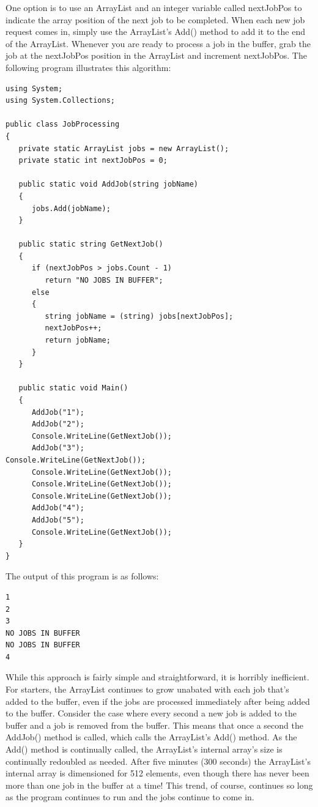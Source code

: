\documentclass[12pt,a4paper,final,twoside,titlepage]{book}
\begin{document}
One option is to use an ArrayList and an integer variable called nextJobPos to indicate the array position of the next job to be completed. When each new job request comes in, simply use the ArrayList's Add() method to add it to the end of the ArrayList. Whenever you are ready to process a job in the buffer, grab the job at the nextJobPos position in the ArrayList and increment nextJobPos. The following program illustrates this algorithm:
\begin{lstlisting}
using System;
using System.Collections;

public class JobProcessing
{
   private static ArrayList jobs = new ArrayList();
   private static int nextJobPos = 0;
   
   public static void AddJob(string jobName)
   {
      jobs.Add(jobName);
   }
   
   public static string GetNextJob()
   {
      if (nextJobPos > jobs.Count - 1)
         return "NO JOBS IN BUFFER";
      else
      {
         string jobName = (string) jobs[nextJobPos];
         nextJobPos++;
         return jobName;
      }
   }
   
   public static void Main()
   {
      AddJob("1");
      AddJob("2");
      Console.WriteLine(GetNextJob());
      AddJob("3");
Console.WriteLine(GetNextJob());
      Console.WriteLine(GetNextJob());
      Console.WriteLine(GetNextJob());
      Console.WriteLine(GetNextJob());
      AddJob("4");
      AddJob("5");
      Console.WriteLine(GetNextJob());
   }
}
\end{lstlisting}
The output of this program is as follows:
\begin{lstlisting}
1
2
3
NO JOBS IN BUFFER
NO JOBS IN BUFFER
4
\end{lstlisting}
While this approach is fairly simple and straightforward, it is horribly inefficient. For starters, the ArrayList continues to grow unabated with each job that's added to the buffer, even if the jobs are processed immediately after being added to the buffer. Consider the case where every second a new job is added to the buffer and a job is removed from the buffer. This means that once a second the AddJob() method is called, which calls the ArrayList's Add() method. As the Add() method is continually called, the ArrayList's internal array's size is continually redoubled as needed. After five minutes (300 seconds) the ArrayList's internal array is dimensioned for 512 elements, even though there has never been more than one job in the buffer at a time! This trend, of course, continues so long as the program continues to run and the jobs continue to come in.
\end{document}
